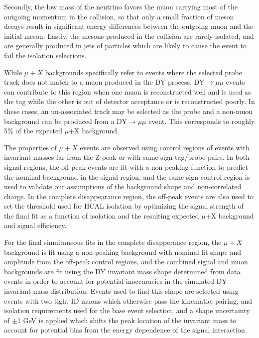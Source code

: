 Secondly, the low mass of the neutrino favors the muon carrying most of the outgoing momentum in the collision, so that only a small fraction of meson decays result in significant energy differences between the outgoing muon and the initial meson.
Lastly, the mesons produced in the collision are rarely isolated, and are generally produced in jets of particles which are likely to cause the event to fail the isolation selections.

While $\mu+X$ backgrounds specifically refer to events where the selected probe track does not match to a muon produced in the DY process, DY$\rightarrow\mu\mu$ events can contribute to this region when one muon is reconstructed well and is used as the tag while the other is out of detector acceptance or is reconstructed poorly. 
In these cases, an un-associated track may be selected as the probe and a non-muon background can be produced from a DY$\rightarrow\mu\mu$ event. 
This corresponds to roughly 5$\%$ of the expected $\mu$+X background.

The properties of $\mu+X$ events are observed using control regions of events with invariant masses far from the Z-peak or with same-sign tag/probe pairs.
In both signal regions, the off-peak events are fit with a non-peaking function to predict the nominal background in the signal region, and the same-sign control region is used to validate our assumptions of the background shape and non-correlated charge.
In the complete disappearance region, the off-peak events are also used to set the threshold used for HCAL isolation by optimizing the signal strength of the final fit as a function of isolation and the resulting expected $\mu$+X background and signal efficiency.

For the final simultaneous fits in the complete disapperance region, the $\mu+X$ background is fit using a non-peaking background with nominal fit shape and amplitude from the off-peak control regions, and the combined signal and muon backgrounds are fit using the DY invariant mass shape determined from data events in order to account for potential inaccuracies in the simulated DY invariant mass distribution.
Events used to find this shape are selected using events with two tight-ID muons which otherwise pass the kinematic, pairing, and isolation requirements used for the base event selection, and a shape uncertainty of $\pm$1 GeV is applied which shifts the peak location of the invariant mass to account for potential bias from the energy dependence of the signal interaction.

